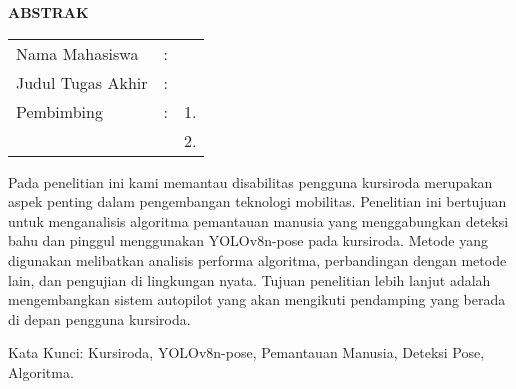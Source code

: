 \begin{center}
  \large\textbf{ABSTRAK}
\end{center}


\vspace{2ex}

\begingroup
\setlength{\tabcolsep}{0pt}

\noindent
\begin{tabularx}{\textwidth}{l >{\centering}m{2em} X}
  Nama Mahasiswa    & : & \name{}         \\

  Judul Tugas Akhir & : & \tatitle{}      \\

  Pembimbing        & : & 1. \advisor{}   \\
                    &   & 2. \coadvisor{} \\
\end{tabularx}
\endgroup

Pada penelitian ini kami memantau disabilitas pengguna kursiroda merupakan aspek penting dalam pengembangan teknologi mobilitas. Penelitian ini bertujuan untuk menganalisis algoritma pemantauan manusia yang menggabungkan deteksi bahu dan pinggul menggunakan YOLOv8n-pose pada kursiroda. Metode yang digunakan melibatkan analisis performa algoritma, perbandingan dengan metode lain, dan pengujian di lingkungan nyata. Tujuan penelitian lebih lanjut adalah mengembangkan sistem autopilot yang akan mengikuti pendamping yang berada di depan pengguna kursiroda.

Kata Kunci: Kursiroda, YOLOv8n-pose, Pemantauan Manusia, Deteksi Pose, Algoritma.
